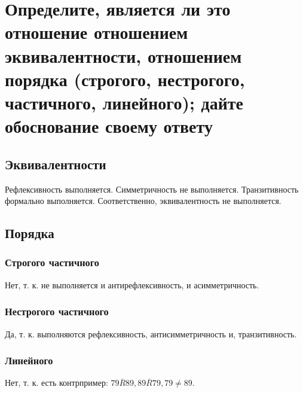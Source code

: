 \vspace{20pt}

{\let\clearpage\relax
    \chapter{Определите, является ли это отношение отношением эквивалентности, отношением порядка (строгого, нестрогого, частичного, линейного); дайте обоснование своему ответу}}
\section{Эквивалентности}
Рефлексивность выполняется. Симметричность не выполняется. Транзитивность формально выполняется. Соответственно, эквивалентность не выполняется.
\section{Порядка}
\subsection{Строгого частичного}
Нет, т. к. не выполняется и антирефлексивность, и асимметричность.
\subsection{Нестрогого частичного}
Да, т. к. выполняются рефлексивность, антисимметричность и, транзитивность.
\subsection{Линейного}
Нет, т. к. есть контрпример: $\overline{79R89}, \overline{89R79}, 79 \neq 89$.
\endinput